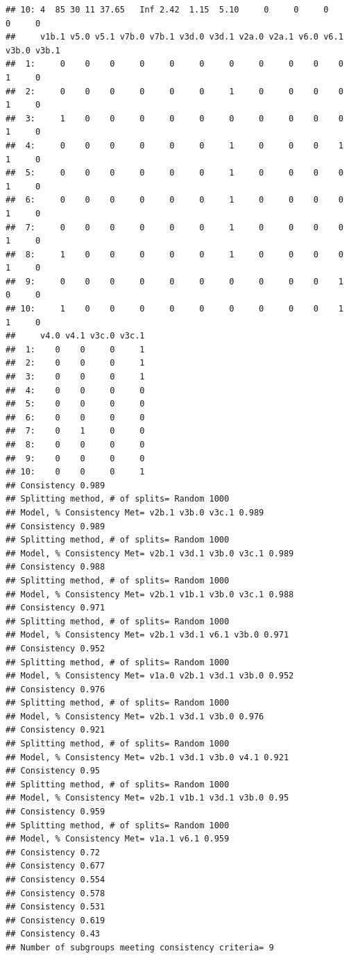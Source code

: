 \documentclass[9pt]{article}\usepackage[]{graphicx}\usepackage[]{xcolor}
\makeatletter
\newenvironment{kframe}{%
 \def\at@end@of@kframe{}%
 \ifinner\ifhmode%
  \def\at@end@of@kframe{\end{minipage}}%
  \begin{minipage}{\columnwidth}%
 \fi\fi%
 \def\FrameCommand##1{\hskip\@totalleftmargin \hskip-\fboxsep
 \colorbox{shadecolor}{##1}\hskip-\fboxsep
     \hskip-\linewidth \hskip-\@totalleftmargin \hskip\columnwidth}%
 \MakeFramed {\advance\hsize-\width
   \@totalleftmargin\z@ \linewidth\hsize
   \@setminipage}}%
 {\par\unskip\endMakeFramed%
 \at@end@of@kframe}
\newenvironment{knitrout}{}{} %
\theoremstyle{definition}
\theoremstyle{remark}
\makeatother
\begin{document}
\begin{knitrout}
\begin{kframe}
\begin{verbatim}
## 10: 4  85 30 11 37.65   Inf 2.42  1.15  5.10     0     0     0     0     0
##     v1b.1 v5.0 v5.1 v7b.0 v7b.1 v3d.0 v3d.1 v2a.0 v2a.1 v6.0 v6.1 v3b.0 v3b.1
##  1:     0    0    0     0     0     0     0     0     0    0    0     1     0
##  2:     0    0    0     0     0     0     1     0     0    0    0     1     0
##  3:     1    0    0     0     0     0     0     0     0    0    0     1     0
##  4:     0    0    0     0     0     0     1     0     0    0    1     1     0
##  5:     0    0    0     0     0     0     1     0     0    0    0     1     0
##  6:     0    0    0     0     0     0     1     0     0    0    0     1     0
##  7:     0    0    0     0     0     0     1     0     0    0    0     1     0
##  8:     1    0    0     0     0     0     1     0     0    0    0     1     0
##  9:     0    0    0     0     0     0     0     0     0    0    1     0     0
## 10:     1    0    0     0     0     0     0     0     0    0    1     1     0
##     v4.0 v4.1 v3c.0 v3c.1
##  1:    0    0     0     1
##  2:    0    0     0     1
##  3:    0    0     0     1
##  4:    0    0     0     0
##  5:    0    0     0     0
##  6:    0    0     0     0
##  7:    0    1     0     0
##  8:    0    0     0     0
##  9:    0    0     0     0
## 10:    0    0     0     1
## Consistency 0.989 
## Splitting method, # of splits= Random 1000 
## Model, % Consistency Met= v2b.1 v3b.0 v3c.1 0.989 
## Consistency 0.989 
## Splitting method, # of splits= Random 1000 
## Model, % Consistency Met= v2b.1 v3d.1 v3b.0 v3c.1 0.989 
## Consistency 0.988 
## Splitting method, # of splits= Random 1000 
## Model, % Consistency Met= v2b.1 v1b.1 v3b.0 v3c.1 0.988 
## Consistency 0.971 
## Splitting method, # of splits= Random 1000 
## Model, % Consistency Met= v2b.1 v3d.1 v6.1 v3b.0 0.971 
## Consistency 0.952 
## Splitting method, # of splits= Random 1000 
## Model, % Consistency Met= v1a.0 v2b.1 v3d.1 v3b.0 0.952 
## Consistency 0.976 
## Splitting method, # of splits= Random 1000 
## Model, % Consistency Met= v2b.1 v3d.1 v3b.0 0.976 
## Consistency 0.921 
## Splitting method, # of splits= Random 1000 
## Model, % Consistency Met= v2b.1 v3d.1 v3b.0 v4.1 0.921 
## Consistency 0.95 
## Splitting method, # of splits= Random 1000 
## Model, % Consistency Met= v2b.1 v1b.1 v3d.1 v3b.0 0.95 
## Consistency 0.959 
## Splitting method, # of splits= Random 1000 
## Model, % Consistency Met= v1a.1 v6.1 0.959 
## Consistency 0.72 
## Consistency 0.677 
## Consistency 0.554 
## Consistency 0.578 
## Consistency 0.531 
## Consistency 0.619 
## Consistency 0.43 
## Number of subgroups meeting consistency criteria= 9 

\end{verbatim}
\end{kframe}
\end{knitrout}
\end{document}
